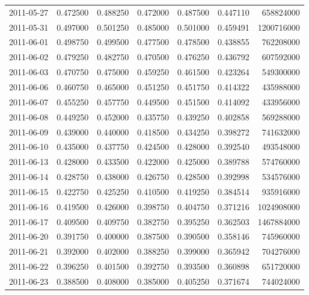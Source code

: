 \begin{tabular}{lrrrrrr}
2011-05-27 &    0.472500 &    0.488250 &    0.472000 &    0.487500 &    0.447110 &   658824000 \\
2011-05-31 &    0.497000 &    0.501250 &    0.485000 &    0.501000 &    0.459491 &  1200716000 \\
2011-06-01 &    0.498750 &    0.499500 &    0.477500 &    0.478500 &    0.438855 &   762208000 \\
2011-06-02 &    0.479250 &    0.482750 &    0.470500 &    0.476250 &    0.436792 &   607592000 \\
2011-06-03 &    0.470750 &    0.475000 &    0.459250 &    0.461500 &    0.423264 &   549300000 \\
2011-06-06 &    0.460750 &    0.465000 &    0.451250 &    0.451750 &    0.414322 &   435988000 \\
2011-06-07 &    0.455250 &    0.457750 &    0.449500 &    0.451500 &    0.414092 &   433956000 \\
2011-06-08 &    0.449250 &    0.452000 &    0.435750 &    0.439250 &    0.402858 &   569288000 \\
2011-06-09 &    0.439000 &    0.440000 &    0.418500 &    0.434250 &    0.398272 &   741632000 \\
2011-06-10 &    0.435000 &    0.437750 &    0.424500 &    0.428000 &    0.392540 &   493548000 \\
2011-06-13 &    0.428000 &    0.433500 &    0.422000 &    0.425000 &    0.389788 &   574760000 \\
2011-06-14 &    0.428750 &    0.438000 &    0.426750 &    0.428500 &    0.392998 &   534576000 \\
2011-06-15 &    0.422750 &    0.425250 &    0.410500 &    0.419250 &    0.384514 &   935916000 \\
2011-06-16 &    0.419500 &    0.426000 &    0.398750 &    0.404750 &    0.371216 &  1024908000 \\
2011-06-17 &    0.409500 &    0.409750 &    0.382750 &    0.395250 &    0.362503 &  1467884000 \\
2011-06-20 &    0.391750 &    0.400000 &    0.387500 &    0.390500 &    0.358146 &   745960000 \\
2011-06-21 &    0.392000 &    0.402000 &    0.388250 &    0.399000 &    0.365942 &   704276000 \\
2011-06-22 &    0.396250 &    0.401500 &    0.392750 &    0.393500 &    0.360898 &   651720000 \\
2011-06-23 &    0.388500 &    0.408000 &    0.385000 &    0.405250 &    0.371674 &   744024000 \\

\end{tabular}
